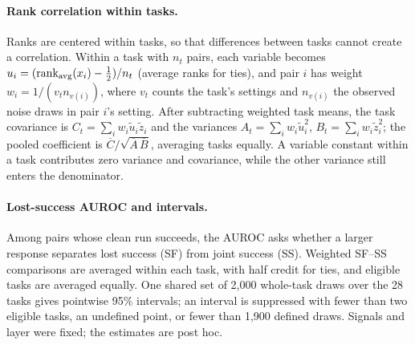 \paragraph{Rank correlation within tasks.}
Ranks are centered within tasks, so that differences between tasks cannot create a correlation. Within a task with $n_t$ pairs, each variable becomes $u_i=(\operatorname{rank}_{\rm avg}(x_i)-\tfrac12)/n_t$ (average ranks for ties), and pair $i$ has weight $w_i=1/(v_t n_{v(i)})$, where $v_t$ counts the task's settings and $n_{v(i)}$ the observed noise draws in pair $i$'s setting. After subtracting weighted task means, the task covariance is $C_t=\sum_iw_i\widetilde u_i\widetilde z_i$ and the variances $A_t=\sum_iw_i\widetilde u_i^2$, $B_t=\sum_iw_i\widetilde z_i^2$; the pooled coefficient is $\overline C/\sqrt{\overline A\,\overline B}$, averaging tasks equally. A variable constant within a task contributes zero variance and covariance, while the other variance still enters the denominator.

\paragraph{Lost-success AUROC and intervals.}
Among pairs whose clean run succeeds, the AUROC asks whether a larger response separates lost success (SF) from joint success (SS). Weighted SF--SS comparisons are averaged within each task, with half credit for ties, and eligible tasks are averaged equally. One shared set of 2,000 whole-task draws over the 28 tasks gives pointwise 95\% intervals; an interval is suppressed with fewer than two eligible tasks, an undefined point, or fewer than 1,900 defined draws. Signals and layer were fixed; the estimates are post hoc.

